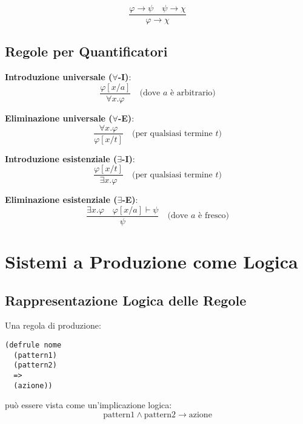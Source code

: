 \begin{teorema}
\begin{equation}
\frac{\varphi \rightarrow \psi \quad \psi \rightarrow \chi}{\varphi \rightarrow \chi}
\end{equation}
\end{teorema}

\subsection{Regole per Quantificatori}

\textbf{Introduzione universale ($\forall$-I)}:
\begin{equation}
\frac{\varphi[x/a]}{\forall x. \varphi} \quad \text{(dove $a$ è arbitrario)}
\end{equation}

\textbf{Eliminazione universale ($\forall$-E)}:
\begin{equation}
\frac{\forall x. \varphi}{\varphi[x/t]} \quad \text{(per qualsiasi termine $t$)}
\end{equation}

\textbf{Introduzione esistenziale ($\exists$-I)}:
\begin{equation}
\frac{\varphi[x/t]}{\exists x. \varphi} \quad \text{(per qualsiasi termine $t$)}
\end{equation}

\textbf{Eliminazione esistenziale ($\exists$-E)}:
\begin{equation}
\frac{\exists x. \varphi \quad \varphi[x/a] \vdash \psi}{\psi} \quad \text{(dove $a$ è fresco)}
\end{equation}

\section{Sistemi a Produzione come Logica}

\subsection{Rappresentazione Logica delle Regole}

Una regola di produzione:
\begin{lstlisting}[language=CLIPS]
(defrule nome
  (pattern1)
  (pattern2)
  =>
  (azione))
\end{lstlisting}

può essere vista come un'implicazione logica:
\begin{equation}
\text{pattern1} \land \text{pattern2} \rightarrow \text{azione}
\end{equation}

